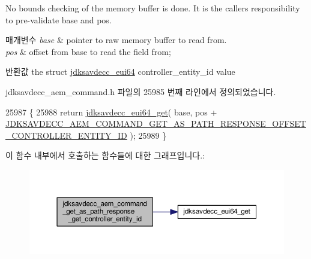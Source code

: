 No bounds checking of the memory buffer is done. It is the caller\textquotesingle{}s responsibility to pre-\/validate base and pos.


\begin{DoxyParams}{매개변수}
{\em base} & pointer to raw memory buffer to read from. \\
\hline
{\em pos} & offset from base to read the field from; \\
\hline
\end{DoxyParams}
\begin{DoxyReturn}{반환값}
the struct \hyperlink{structjdksavdecc__eui64}{jdksavdecc\+\_\+eui64} controller\+\_\+entity\+\_\+id value 
\end{DoxyReturn}


jdksavdecc\+\_\+aem\+\_\+command.\+h 파일의 25985 번째 라인에서 정의되었습니다.


\begin{DoxyCode}
25987 \{
25988     \textcolor{keywordflow}{return} \hyperlink{group__eui64_ga2652311a25a6b91cddbed75c108c7031}{jdksavdecc\_eui64\_get}( base, pos + 
      \hyperlink{group__command__get__as__path__response_gafad90528502d9004cec7392c98d5a112}{JDKSAVDECC\_AEM\_COMMAND\_GET\_AS\_PATH\_RESPONSE\_OFFSET\_CONTROLLER\_ENTITY\_ID}
       );
25989 \}
\end{DoxyCode}


이 함수 내부에서 호출하는 함수들에 대한 그래프입니다.\+:
\nopagebreak
\begin{figure}[H]
\begin{center}
\leavevmode
\includegraphics[width=350pt]{group__command__get__as__path__response_gab7f7ae65fef28aa2c9d860e5ddff4766_cgraph}
\end{center}
\end{figure}


